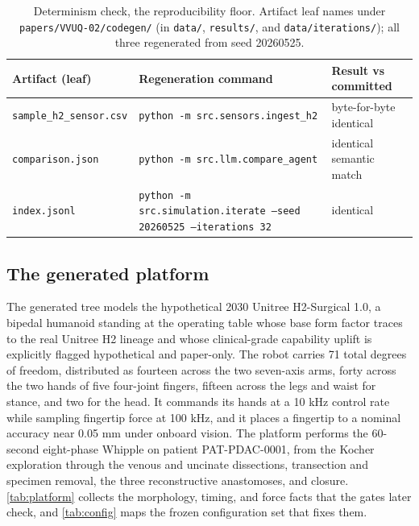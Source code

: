 \begin{table}[H]
\caption{Determinism check, the reproducibility floor. Artifact leaf names under
\texttt{papers/VVUQ-02/codegen/} (in \texttt{data/}, \texttt{results/}, and
\texttt{data/iterations/}); all three regenerated from seed 20260525.}
\label{tab:determinism}
\centering
\footnotesize
\begin{tabularx}{\textwidth}{L{3.1cm} Y L{3.4cm}}
\toprule
\textbf{Artifact (leaf)} & \textbf{Regeneration command} & \textbf{Result vs committed} \\
\midrule
\texttt{sample\_h2\_sensor.csv} & \texttt{python -m src.sensors.ingest\_h2} & byte-for-byte identical \\
\texttt{comparison.json} & \texttt{python -m src.llm.compare\_agent} & identical semantic match \\
\texttt{index.jsonl} & \texttt{python -m src.simulation.iterate --seed 20260525 --iterations 32} & identical \\
\bottomrule
\end{tabularx}
\end{table}

\subsection{The generated platform}

The generated tree models the hypothetical 2030 Unitree H2-Surgical 1.0, a
bipedal humanoid standing at the operating table whose base form factor traces to
the real Unitree H2 lineage and whose clinical-grade capability uplift is
explicitly flagged hypothetical and paper-only. The robot carries 71 total
degrees of freedom, distributed as fourteen across the two seven-axis arms, forty
across the two hands of five four-joint fingers, fifteen across the legs and
waist for stance, and two for the head. It commands its hands at a 10 kHz control
rate while sampling fingertip force at 100 kHz, and it places a fingertip to a
nominal accuracy near 0.05 mm under onboard vision. The platform performs the
60-second eight-phase Whipple on patient PAT-PDAC-0001, from the Kocher
exploration through the venous and uncinate dissections, transection and specimen
removal, the three reconstructive anastomoses, and closure. \autoref{tab:platform}
collects the morphology, timing, and force facts that the gates later check, and
\autoref{tab:config} maps the frozen configuration set that fixes them.

